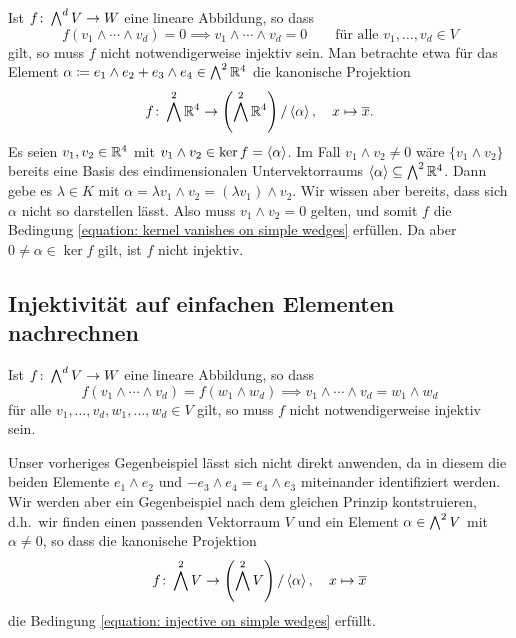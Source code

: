Ist $f \colon \bigwedge^{d} V \to W$ eine lineare Abbildung, so dass
\begin{equation}
  \label{equation: kernel vanishes on simple wedges}
            f(v_1 \wedge \dotsb \wedge v_d) = 0
  \implies  v_1 \wedge \dotsb \wedge v_d = 0
  \qquad
  \text{für alle $v_1, \dotsc, v_d \in V$}
\end{equation}
gilt, so muss $f$ nicht notwendigerweise injektiv sein.
Man betrachte etwa für das Element $\alpha \coloneqq e_1 \wedge e_2 + e_3 \wedge e_4 \in \bigwedge^{2} \mathbb{R}^4$ die kanonische Projektion
\[
          f
  \colon  \bigwedge^{2} \mathbb{R}^4
  \to     \left( \bigwedge^{2} \mathbb{R}^4 \right) / \left\langle \alpha \right\rangle,
  \quad   x
  \mapsto \overline{x}.
\]
Es seien $v_1, v_2 \in \mathbb{R}^4$ mit $v_1 \wedge v_2 \in \ker f = \left\langle \alpha \right\rangle$.
Im Fall $v_1 \wedge v_2 \neq 0$ wäre $\{ v_1 \wedge v_2 \}$ bereits eine Basis des eindimensionalen Untervektorraums $\left\langle \alpha \right\rangle \subseteq \bigwedge^{2} \mathbb{R}^4$.
Dann gebe es $\lambda \in K$ mit $\alpha = \lambda v_1 \wedge v_2 = (\lambda v_1) \wedge v_2$.
Wir wissen aber bereits, dass sich $\alpha$ nicht so darstellen lässt.
Also muss $v_1 \wedge v_2 = 0$ gelten, und somit $f$ die Bedingung \eqref{equation: kernel vanishes on simple wedges} erfüllen.
Da aber $0 \neq \alpha \in \ker f$ gilt, ist $f$ nicht injektiv.





\subsection{Injektivität auf einfachen Elementen nachrechnen}

Ist $f \colon \bigwedge^{d} V \to W$ eine lineare Abbildung, so dass
\begin{equation}
  \label{equation: injective on simple wedges}
            f(v_1 \wedge \dotsb \wedge v_d) = f(w_1 \wedge w_d)
  \implies  v_1 \wedge \dotsb \wedge v_d = w_1 \wedge w_d
\end{equation}
für alle $v_1, \dotsc, v_d, w_1, \dotsc, w_d \in V$ gilt, so muss $f$ nicht notwendigerweise injektiv sein.

Unser vorheriges Gegenbeispiel lässt sich nicht direkt anwenden, da in diesem die beiden Elemente $e_1 \wedge e_2$ und $- e_3 \wedge e_4 = e_4 \wedge e_3$ miteinander identifiziert werden.
Wir werden aber ein Gegenbeispiel nach dem gleichen Prinzip kontstruieren, d.h.\ wir finden einen passenden Vektorraum $V$ und ein Element $\alpha \in \bigwedge^{2} V$ mit $\alpha \neq 0$, so dass die kanonische Projektion
\[
          f
  \colon  \bigwedge^{2} V
  \to     \left( \bigwedge^{2} V \right) / \left\langle \alpha \right\rangle,
  \quad   x
  \mapsto \overline{x}
\]
die Bedingung \eqref{equation: injective on simple wedges} erfüllt.

